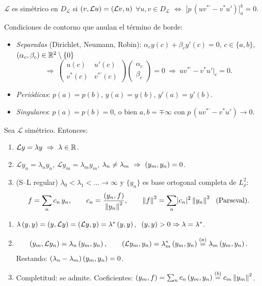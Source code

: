 \documentclass[11pt,a4paper,twoside]{article}
\newcommand{\Lop}{\mathcal{L}}
\begin{document}
\begin{definicion}
$\Lop$ es simétrico en $D_{\Lop}$ si $\ip{v}{\Lop u}=\ip{\Lop v}{u}$ $\forall u,v\in D_{\Lop}$
$\iff$ $\bigl[p\,(u v^{*\prime}-v^*u')\bigr]_a^b=0$.
\end{definicion}

Condiciones de contorno que anulan el término de borde:
\begin{itemize}
\item \emph{Separadas} (Dirichlet, Neumann, Robin): $\alpha_c y(c)+\beta_c y'(c)=0$, $c\in\{a,b\}$, $(\alpha_c,\beta_c)\in\mathbb{R}^2\setminus\{0\}$
\[
\Rightarrow\ \begin{pmatrix}u(c)&u'(c)\\ v^*(c)&v^{*\prime}(c)\end{pmatrix}\!\begin{pmatrix}\alpha_c\\ \beta_c\end{pmatrix}=0
\ \Rightarrow\ u v^{*\prime}-v^*u'\big|_{c}=0 .
\]
\item \emph{Periódicas}: $p(a)=p(b)$, $y(a)=y(b)$, $y'(a)=y'(b)$.
\item \emph{Singulares}: $p(a)=p(b)=0$, o bien $a,b=\mp\infty$ con $p\,(uv^{*\prime}-v^*u')\to0$.
\end{itemize}

\begin{teorema}
Sea $\Lop$ simétrico. Entonces:
\begin{enumerate}[label=(\alph*)]
\item $\Lop y=\lambda y\ \Rightarrow\ \lambda\in\R$.
\item $\Lop y_n=\lambda_n y_n$, $\Lop y_m=\lambda_m y_m$, $\lambda_n\neq\lambda_m\ \Rightarrow\ \ip{y_m}{y_n}=0$.
\item (S--L regular) $\lambda_0<\lambda_1<\dots\to\infty$ y $\{y_n\}$ es base ortogonal completa de $L^2_\rho$:
\begin{equation}\label{eq:desarrollo}
f=\sum_{n}c_n\,y_n,\qquad c_n=\frac{\ip{y_n}{f}}{\norm{y_n}^2},\qquad
\norm{f}^2=\sum_n\lvert c_n\rvert^2\norm{y_n}^2\ \ (\text{Parseval}).
\end{equation}
\end{enumerate}
\end{teorema}

\begin{demostracion}
\begin{enumerate}
\item[(a)] $\lambda\ip{y}{y}=\ip{y}{\Lop y}=\ip{\Lop y}{y}=\lambda^*\ip{y}{y}$, $\ \ip{y}{y}>0\Rightarrow\lambda=\lambda^*$.
\item[(b)] \[
\ip{y_m}{\Lop y_n}=\lambda_n\ip{y_m}{y_n},\qquad
\ip{\Lop y_m}{y_n}=\lambda_m^*\ip{y_m}{y_n}\overset{(a)}{=}\lambda_m\ip{y_m}{y_n}.
\]
Restando: $(\lambda_n-\lambda_m)\left(y_m,y_n\right)=0$.
\item[(c)] Completitud: se admite. Coeficientes: $\left(y_m,f\right)=\sum_n c_n\left(y_m,y_n\right)\overset{(b)}{=}c_m\left\lVert y_m\right\rVert^2$.
\end{enumerate}
\end{demostracion}
\end{document}
